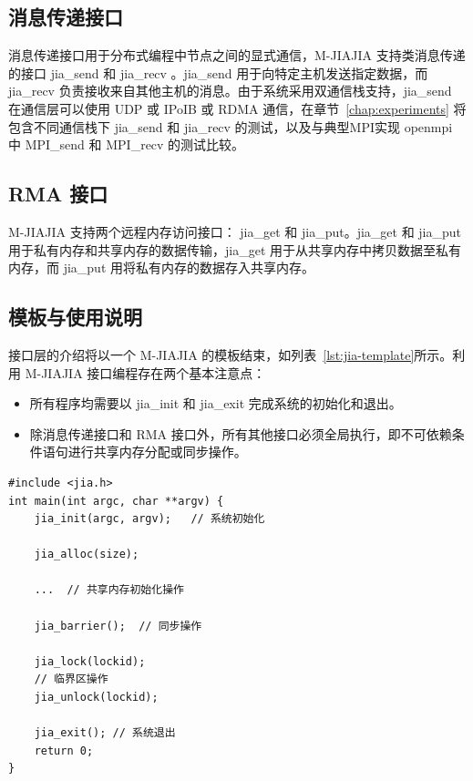 {\subsection{消息传递接口}
消息传递接口用于分布式编程中节点之间的显式通信，M-JIAJIA 支持类消息传递的接口 jia\_send 和 jia\_recv 。jia\_send 用于向特定主机发送指定数据，而 jia\_recv 负责接收来自其他主机的消息。由于系统采用双通信栈支持，jia\_send 在通信层可以使用 UDP 或 IPoIB 或 RDMA 通信，在章节~\ref{chap:experiments} 将包含不同通信栈下 jia\_send 和 jia\_recv 的测试，以及与典型MPI实现 openmpi 中 MPI\_send 和 MPI\_recv 的测试比较。

\subsection{RMA 接口}
M-JIAJIA 支持两个远程内存访问接口： jia\_get 和 jia\_put。jia\_get 和 jia\_put 用于私有内存和共享内存的数据传输，jia\_get 用于从共享内存中拷贝数据至私有内存，而 jia\_put 用将私有内存的数据存入共享内存。
\subsection{模板与使用说明}
接口层的介绍将以一个 M-JIAJIA 的模板结束，如列表~\ref{lst:jia-template}所示。利用 M-JIAJIA 接口编程存在两个基本注意点：
\begin{itemize}
    \item 所有程序均需要以 jia\_init 和 jia\_exit 完成系统的初始化和退出。
    \item 除消息传递接口和 RMA 接口外，所有其他接口必须全局执行，即不可依赖条件语句进行共享内存分配或同步操作。
\end{itemize}
\begin{lstlisting}[style=CStyle, caption={M-JIAJIA 应用模板}, label={lst:jia-template}]
#include <jia.h>
int main(int argc, char **argv) {
    jia_init(argc, argv);   // 系统初始化

    jia_alloc(size);
    
    ...  // 共享内存初始化操作

    jia_barrier();  // 同步操作    

    jia_lock(lockid);
    // 临界区操作
    jia_unlock(lockid);
    
    jia_exit(); // 系统退出
    return 0;
}
\end{lstlisting}
}
